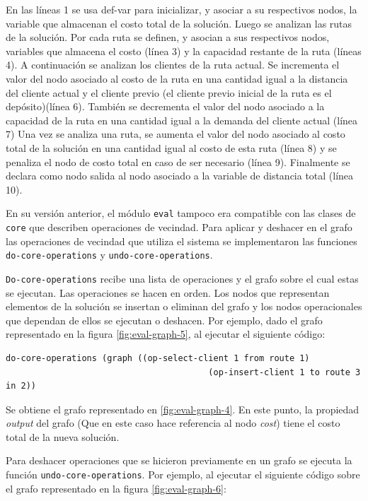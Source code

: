 En las líneas 1 se usa def-var para inicializar, y asociar a su respectivos nodos, la variable que almacenan el costo total de la solución. Luego se analizan las rutas de la solución. Por cada ruta se definen, y asocian a sus respectivos nodos, variables que almacena el costo (línea 3) y la capacidad restante de la ruta (líneas 4). A continuación se analizan los clientes de la ruta actual. Se incrementa el valor del nodo asociado al costo de la ruta en una cantidad igual a la distancia del cliente actual y el cliente previo (el cliente previo inicial de la ruta es el depósito)(línea 6). También se decrementa el valor del nodo asociado a la capacidad de la ruta en una cantidad igual a la demanda del cliente actual (línea 7) Una vez se analiza una ruta, se aumenta el valor del nodo asociado al costo total de la solución en una cantidad igual al costo de esta ruta (línea 8) y se penaliza el nodo de costo total en caso de ser necesario (línea 9). Finalmente se declara como nodo salida al nodo asociado a la variable de distancia total (línea 10).

En su versión anterior, el módulo \texttt{eval} tampoco era compatible con las clases de \texttt{core} que describen operaciones de vecindad. Para aplicar y deshacer en el grafo las operaciones de vecindad que utiliza el sistema se implementaron las funciones \texttt{do-core-operations} y \texttt{undo-core-operations}.

\texttt{Do-core-operations} recibe una lista de operaciones y el grafo sobre el cual estas se ejecutan. Las operaciones se hacen en orden. Los nodos que representan elementos de la solución se insertan o eliminan del grafo y los nodos operacionales que dependan de ellos se ejecutan o deshacen. Por ejemplo, dado el grafo representado en la figura \ref{fig:eval-graph-5}, al ejecutar el siguiente código:



\begin{lstlisting}
do-core-operations (graph ((op-select-client 1 from route 1)
										(op-insert-client 1 to route 3 in 2))
\end{lstlisting}

Se obtiene el grafo representado en \ref{fig:eval-graph-4}. En este punto, la propiedad \textit{output} del grafo (Que en este caso hace referencia al nodo \textit{cost}) tiene el costo total de la nueva solución.

Para deshacer operaciones que se hicieron previamente en un grafo se ejecuta la función \texttt{undo-core-operations}. Por ejemplo, al ejecutar el siguiente código sobre el grafo representado en la figura \ref{fig:eval-graph-6}:



